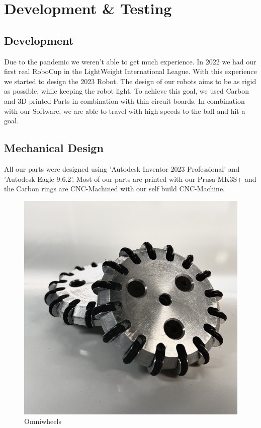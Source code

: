 \section{Development \& Testing}

\subsection{Development}
Due to the pandemic we weren't able to get much experience. In 2022 we had our first real RoboCup
in the LightWeight International League. With this experience we started to design the 2023 Robot.
\newline
The design of our robots aims to be as rigid as possible, while keeping the robot light.
To achieve this goal, we used Carbon and 3D printed Parts in combination with thin circuit boards.
In combination with our Software, we are able to travel with high speeds to the ball and
hit a goal.

\subsection{Mechanical Design}
All our parts were designed using 'Autodesk Inventor 2023 Professional' and 'Autodesk Eagle 9.6.2'.
Most of our parts are printed with our Prusa MK3S+ and the Carbon rings are CNC-Machined
with our self build CNC-Machine.
\newline
\newline

\begin{figure}
    \centering
    \includegraphics[width=1\linewidth]{img/inv/OmniWheel.jpg}
    \caption{Omniwheels}
    \label{fig:OmniWheels}
\end{figure}

